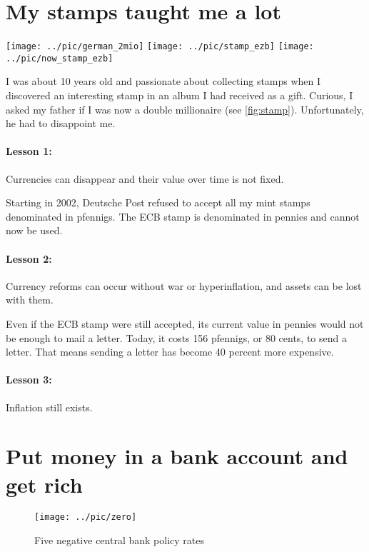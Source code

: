 \section{My stamps taught me a lot}

\begin{center}
\texttt{[image: ../pic/german\_2mio]}
\texttt{[image: ../pic/stamp\_ezb]}
\texttt{[image: ../pic/now\_stamp\_ezb]}
\label{fig:stamp}

\end{center}

I was about 10 years old and passionate about collecting stamps when I discovered an interesting stamp in an album I had received as a gift. Curious, I asked my father if I was now a double millionaire (see \autoref{fig:stamp}). Unfortunately, he had to disappoint me. 
\paragraph{Lesson 1:} Currencies can disappear and their value over time is not fixed.

Starting in 2002, Deutsche Post refused to accept all my mint stamps denominated in pfennigs. The ECB stamp is denominated in pennies and cannot now be used.
\paragraph{Lesson 2:} Currency reforms can occur without war or hyperinflation, and assets can be lost with them. 

Even if the ECB stamp were still accepted, its current value in pennies would not be enough to mail a letter. Today, it costs 156 pfennigs, or 80 cents, to send a letter. That means sending a letter has become 40 percent more expensive. 
\paragraph{Lesson 3:} Inflation still exists.


\section{Put money in a bank account and get rich}

\begin{figure}
	\begin{center}
		\texttt{[image: ../pic/zero]}
	\end{center}
	\caption{Five negative central bank policy rates}\label{fig:fivenegative}
\end{figure}

